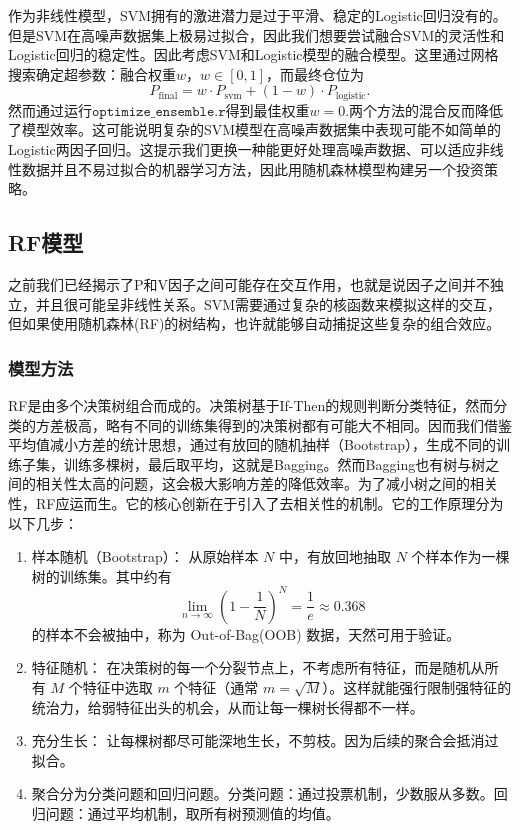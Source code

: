 \documentclass[11pt, a4paper]{article}
\begin{document}
作为非线性模型，SVM拥有的激进潜力是过于平滑、稳定的Logistic回归没有的。但是SVM在高噪声数据集上极易过拟合，因此我们想要尝试融合SVM的灵活性和Logistic回归的稳定性。因此考虑SVM和Logistic模型的融合模型。这里通过网格搜索确定超参数：融合权重$w$，$w \in [0, 1]$，而最终仓位为
$$P_{\text{final}} = w \cdot P_{\text{svm}} + (1-w) \cdot P_{\text{logistic}}.$$
然而通过运行$\texttt{optimize\_ensemble.r}$得到最佳权重$w=0$.两个方法的混合反而降低了模型效率。这可能说明复杂的SVM模型在高噪声数据集中表现可能不如简单的Logistic两因子回归。这提示我们更换一种能更好处理高噪声数据、可以适应非线性数据并且不易过拟合的机器学习方法，因此用随机森林模型构建另一个投资策略。
\subsection{RF模型}
之前我们已经揭示了P和V因子之间可能存在交互作用，也就是说因子之间并不独立，并且很可能呈非线性关系。SVM需要通过复杂的核函数来模拟这样的交互，但如果使用随机森林(RF)的树结构，也许就能够自动捕捉这些复杂的组合效应。
\subsubsection{模型方法}
RF是由多个决策树组合而成的。决策树基于If-Then的规则判断分类特征，然而分类的方差极高，略有不同的训练集得到的决策树都有可能大不相同。因而我们借鉴平均值减小方差的统计思想，通过有放回的随机抽样（Bootstrap），生成不同的训练子集，训练多棵树，最后取平均，这就是Bagging。然而Bagging也有树与树之间的相关性太高的问题，这会极大影响方差的降低效率。为了减小树之间的相关性，RF应运而生。它的核心创新在于引入了去相关性的机制。它的工作原理分为以下几步：
\begin{enumerate}
    \item 样本随机（Bootstrap）： 从原始样本 $N$ 中，有放回地抽取 $N$ 个样本作为一棵树的训练集。其中约有$$\lim_{n \to \infty} (1 - \frac{1}{N})^N = \frac{1}{e} \approx 0.368$$的样本不会被抽中，称为 Out-of-Bag(OOB) 数据，天然可用于验证。
    \item 特征随机： 在决策树的每一个分裂节点上，不考虑所有特征，而是随机从所有 $M$ 个特征中选取 $m$ 个特征（通常 $m = \sqrt{M}$）。这样就能强行限制强特征的统治力，给弱特征出头的机会，从而让每一棵树长得都不一样。
    \item 充分生长： 让每棵树都尽可能深地生长，不剪枝。因为后续的聚合会抵消过拟合。
    \item 聚合分为分类问题和回归问题。分类问题：通过投票机制，少数服从多数。回归问题：通过平均机制，取所有树预测值的均值。
\end{enumerate}
\end{document}
